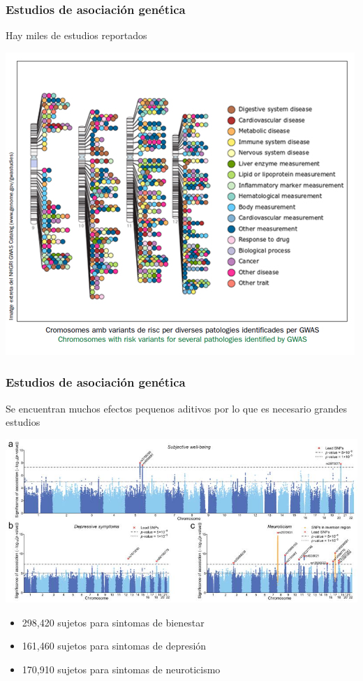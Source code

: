 \documentclass{beamer}\usepackage[]{graphicx}\usepackage[]{color}
\begin{document}
\begin{frame}[fragile]
\frametitle{Estudios de asociaci\'on gen\'etica}

Hay miles de estudios reportados
\begin{center}
\includegraphics[width=0.7\linewidth]{gwascat.jpg}
\end{center}
\end{frame}


\begin{frame}[fragile]
\frametitle{Estudios de asociaci\'on gen\'etica}

Se encuentran muchos efectos pequenos aditivos por lo que es necesario grandes estudios 
\begin{center}
\includegraphics[width=0.7\linewidth]{neurotic.jpg}
\end{center}

\begin{itemize}
\item  298,420 sujetos para sintomas de bienestar
\item  161,460 sujetos para sintomas de depresi\'on
\item  170,910 sujetos para sintomas de neuroticismo
\end{itemize}
\end{frame}
\end{document}
